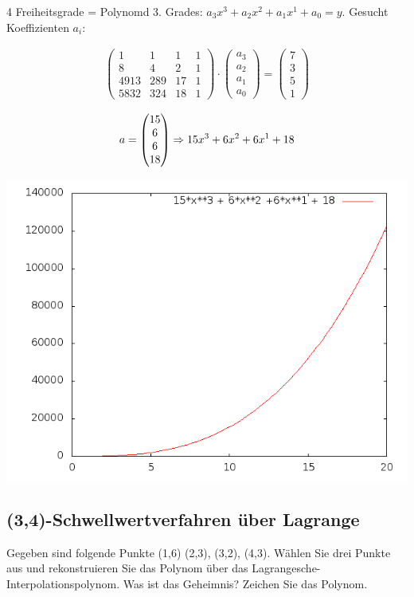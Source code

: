4 Freiheitsgrade = Polynomd 3. Grades: $a_3 x^3 +a_2 x^2 +a_1 x^1 +a_0 = y$.
Gesucht Koeffizienten $a_i$:

\begin{align}
	\begin{pmatrix}
1 & 1 & 1 & 1 \\ 
8 & 4 & 2 & 1 \\ 
4913 & 289 & 17 & 1 \\ 
5832 & 324 & 18 & 1
\end{pmatrix} 
\cdot  \begin{pmatrix} a_3 \\ a_2 \\ a_1 \\ a_0  \end{pmatrix} 
=  \begin{pmatrix} 7 \\ 3 \\ 5 \\ 1  \end{pmatrix} 
\end{align}

\begin{align} a = 
\begin{pmatrix}
15 \\ 6  \\ 6 \\ 18 \\
\end{pmatrix} \Rightarrow 15 x^3 + 6 x^2 +6 x^1 +18
\end{align}

\includegraphics[scale=0.5]{images/ueb82_3.png}

\subsection{(3,4)-Schwellwertverfahren über Lagrange}
Gegeben sind folgende Punkte (1,6) (2,3), (3,2), (4,3).
Wählen Sie drei Punkte aus und rekonstruieren Sie das Polynom über das
Lagrangesche-Interpolationspolynom.
Was ist das Geheimnis? Zeichen Sie das Polynom.
